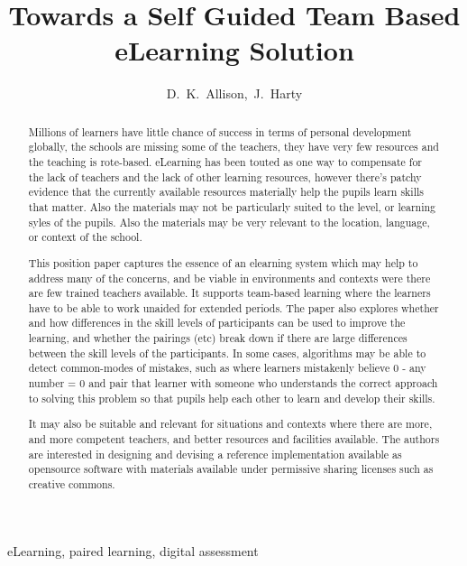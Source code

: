 \documentclass[11pt]{IEEEtran}
\begin{document}
\title{Towards a Self Guided Team Based eLearning Solution}

\author{D.~K.~Allison,~J.~Harty}

\maketitle


\begin{abstract}
Millions of learners have little chance of success in terms of personal 
development globally, the schools are missing some of the teachers, they have 
very few resources and the teaching is rote-based. eLearning has been touted as 
one way to compensate for the lack of teachers and the lack of other learning
resources, however there's patchy evidence that the currently available 
resources materially help the pupils learn skills that matter. Also the 
materials may not be particularly suited to the level, or learning syles of the 
pupils. Also the materials may be very relevant to the location, language, or 
context of the school.

This position paper captures the essence of an elearning system which may help 
to address many of the concerns, and be viable in environments and contexts were
there are few trained teachers available. It supports team-based learning where 
the learners have to be able to work unaided for extended periods. The paper 
also explores whether and how differences in the skill levels of participants 
can be used to improve the learning, and whether the pairings (etc) break down 
if there are large differences between the skill levels of the participants. In 
some cases, algorithms may be able to detect common-modes of mistakes, such as 
where learners mistakenly believe 0 - any number = 0 and pair that learner with 
someone who understands the correct approach to solving this problem so that 
pupils help each other to learn and develop their skills.

It may also be suitable and relevant for situations and contexts where there are
more, and more competent teachers, and better resources and facilities 
available. The authors are interested in designing and devising a reference
implementation available as opensource software with materials available under
permissive sharing licenses such as creative commons.
\end{abstract}

\begin{IEEEkeywords}
eLearning, paired learning, digital assessment
\end{IEEEkeywords}
\end{document}
